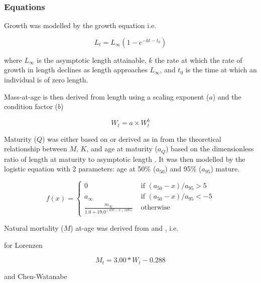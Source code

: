 \documentclass[%
nonumbib,      %
%
]{nrc1}                          %
\begin{document}
\subsubsection*{Equations}

Growth was modelled by the \cite{vonbert1957quantitative} growth equation i.e.
 
\begin{equation} L_t = L_{\infty}(1 - e^{-kt-t_0}) \end{equation} 
 
where $L_{\infty}$ is the asymptotic length attainable, $k$ the rate at which the rate of growth in length declines as length approaches
$L_{\infty}$, and $t_{0}$ is the time at which an individual is of zero length. 
 
Mass-at-age is then derived from length using a scaling exponent ($a$) and the condition factor ($b$)
 
\begin{equation} W_t = a \times W_t^b \end{equation} 
 
Maturity ($Q$) was either based on \cite{santiago2004dinamica}  or derived as in \cite{williams2003implications} 
from the theoretical relationship between $M$, $K$, and age at maturity ($a_{Q}$)  
based on the dimensionless ratio of length at maturity to asymptotic length \citep{beverton1992patterns}. It was then  
modelled by the logistic equation with 2 parameters: age at 50\% ($a_{50}$) and 95\% ($a_{95}$) mature.

\begin{equation}
f(x) = \left\{ \begin{array}{ll}
			0                                 &\mbox{ if $(a_{50}-x)/a_{95} >  5$} \\
			a_{\infty}                        &\mbox{ if $(a_{50}-x)/a_{95} < -5$} \\
			\frac{m_{\infty}}{1.0+19.0^{(a50-x)/{a95})}} &\mbox{ otherwise}
		\end{array}
       \right.
\end{equation}

Natural mortality ($M$) at-age was derived from \cite{lorenzen2002density} and \cite{chen1989age}, i.e.

for Lorenzen
 
\begin{equation}
   M_t=3.00*W_t-0.288
\end{equation}
   
   and Chen-Watanabe
 
\end{document}
